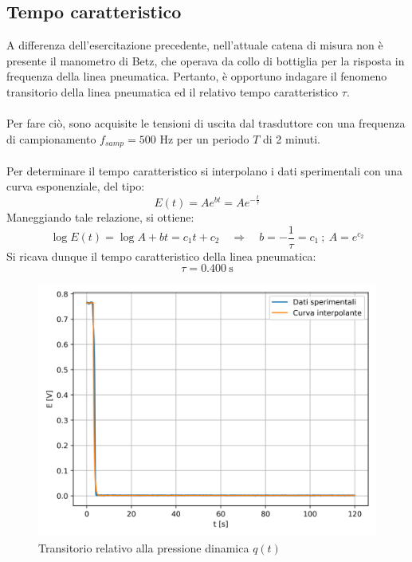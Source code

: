 \newpage
\subsection{Tempo caratteristico}
A differenza dell'esercitazione precedente, nell'attuale catena di misura non è presente il manometro di Betz, che operava da collo di bottiglia per la risposta in frequenza della linea pneumatica. Pertanto, è opportuno indagare il fenomeno transitorio della linea pneumatica ed il relativo tempo caratteristico $\tau$.\\\\
Per fare ciò, sono acquisite le tensioni di uscita dal trasduttore con una frequenza di campionamento $f_{samp}=500$ Hz per un periodo $T$ di 2 minuti.\\\\
Per determinare il tempo caratteristico si interpolano i dati sperimentali con una curva esponenziale, del tipo:
\begin{equation*}
    E(t) = Ae^{bt} = Ae^{-\frac t\tau}
\end{equation*}
Maneggiando tale relazione, si ottiene:
\begin{equation*}
    \log E(t) = \log A + bt = c_1 t + c_2 \quad \Rightarrow \quad b = -\frac1\tau = c_1 \ ; \ A = e^{c_2}
\end{equation*}
Si ricava dunque il tempo caratteristico della linea pneumatica:
\begin{equation*}
    \tau = 0.400\ \text{s}
\end{equation*}
\begin{figure}[H]
    \centering
    \includegraphics[width=.9\textwidth]{images/2/transitorio.png}
    \caption{Transitorio relativo alla pressione dinamica $q(t)$}\label{fig:t2}
\end{figure}